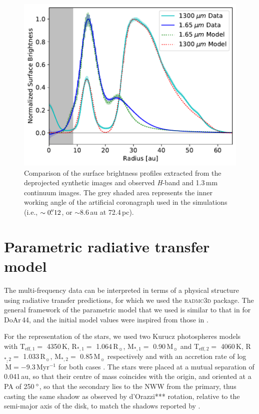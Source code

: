 \documentclass[letters,usenatbib,times]{mnras}
\begin{document}
\begin{figure}
	\includegraphics[width=\columnwidth]{comp_fig_all_profiles_au.pdf}
    \caption{Comparison of the surface brightness profiles extracted from the deprojected synthetic images and observed \textit{H}-band and 1.3\,mm continuum images. The grey shaded area represents the inner working angle of the artificial coronagraph used in the simulations (i.e., $\sim0\hbox{$.\!\!^{\prime\prime}$} 12$, or $\sim$8.6\,au at 72.4\,pc).}
    \label{fig:radprofiles}
\end{figure}

\section{Parametric radiative transfer model} \label{sec:model}

The multi-frequency data can be interpreted in terms of a physical structure using radiative transfer predictions, for which we used the \textsc{radmc3d} package\citep{Dullemond_2012}. The general framework of the parametric model that we used is similar to that in \citet{2018MNRAS.477.5104C} for DoAr\,44, and the initial model values were inspired from those in \citet{Rosenfeld_2013}.

For the representation of the stars, we used two Kurucz photospheres models \citep{1979ApJS...40....1K, 1997A&A...318..841C} with T$_{\mathrm{eff},1} =$ 4350\,K, R$_{*,1} =$ 1.064\,R$_{\sun}$, M$_{*,1} =$ 0.90\,M$_{\sun}$ and T$_{\mathrm{eff},2} =$ 4060\,K, R$_{*,2} =$ 1.033\,R$_{\sun}$, M$_{*,2} =$ 0.85\,M$_{\sun}$ respectively and with an accretion rate of log$\,\dot{\mathrm{M}} = -$9.3\,Myr$^{-1}$ for both cases \citep{10.1111/j.1365-2966.2011.19366.x}. The stars were placed at a  mutual separation of 0.041\,au, so that their centre of mass coincides with the origin,  and oriented at a PA of 250\,$\hbox{$^\circ$}$, so that the secondary lies to the NWW from the primary, thus casting the same shadow as observed by d'Orazzi***  rotation, relative to the semi-major axis of the disk, to match the shadows reported by \citet{dOrazi}.
\end{document}
